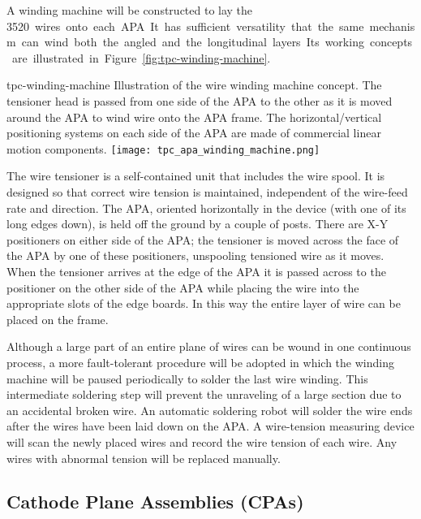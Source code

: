 A winding machine will be constructed to lay the \SI{3520} wires onto
each APA. It has sufficient versatility that the same mechanism can
wind both the angled and the longitudinal layers. Its working concepts
are illustrated in Figure~\ref{fig:tpc-winding-machine}.
\begin{cdrfigure}{tpc-winding-machine}
{Illustration of the wire winding machine concept.  The tensioner 
head is passed from one side of the APA to the other as it is moved 
around the APA to wind wire onto the APA frame.  The horizontal/vertical 
positioning systems on each side of the APA are made of commercial linear motion components. }
\texttt{[image: tpc\_apa\_winding\_machine.png]}
\end{cdrfigure}
The wire tensioner is a self-contained unit that includes the wire
spool.  It is designed so that correct wire tension is maintained,
independent of the wire-feed rate and direction.  The APA, oriented
horizontally in the device (with one of its long edges down), is held
off the ground by a couple of posts.  There are X-Y positioners on
either side of the APA; the tensioner is moved across the face of the
APA by one of these positioners, unspooling tensioned wire as it
moves.  When the tensioner arrives at the edge of the APA it is passed
across to the positioner on the other side of the APA while placing
the wire into the appropriate slots of the edge boards.  In this way
the entire layer of wire can be placed on the frame.

Although a large part of an entire plane of wires can be wound in one
continuous process, a more fault-tolerant procedure will be adopted in
which the winding machine will be paused periodically to solder the
last wire winding. This intermediate soldering step will prevent the
unraveling of a large section due to an accidental broken wire.  An
automatic soldering robot will solder the wire ends after the wires
have been laid down on the APA. A wire-tension measuring device will
scan the newly placed wires and record the wire tension of each
wire. Any wires with abnormal tension will be replaced manually.


\subsection{Cathode Plane Assemblies (CPAs)}
\label{subsec:fd-ref-cpa}

